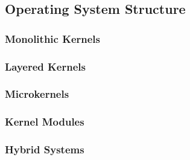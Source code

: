 \subsection{Operating System Structure}\label{subsec:OS_Structure}
\subsubsection{Monolithic Kernels}\label{subsubsec:Monolithic_Kernels}
\subsubsection{Layered Kernels}\label{subsubsec:Layered_Kernels}
\subsubsection{Microkernels}\label{subsubsec:Microkernels}
\subsubsection{Kernel Modules}\label{subsubsec:Kernel_Modules}
\subsubsection{Hybrid Systems}\label{subsubsec:Hybrid_Systems}

